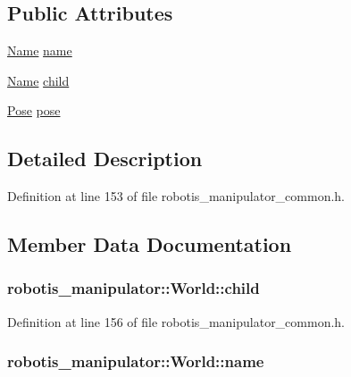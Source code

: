 \subsection*{Public Attributes}
\begin{DoxyCompactItemize}
\item 
\hyperlink{namespacerobotis__manipulator_a08c2d25e77a01ad75b9bb740f8ce4765}{Name} \hyperlink{structrobotis__manipulator_1_1_world_a9737d501dea9b5f0a16ef0c7ba36bff2}{name}
\item 
\hyperlink{namespacerobotis__manipulator_a08c2d25e77a01ad75b9bb740f8ce4765}{Name} \hyperlink{structrobotis__manipulator_1_1_world_a3f0a733de48c8f9bda4ae739c8bbaa08}{child}
\item 
\hyperlink{structrobotis__manipulator_1_1_pose}{Pose} \hyperlink{structrobotis__manipulator_1_1_world_ac396be42979a8e6537638e8f552b3144}{pose}
\end{DoxyCompactItemize}


\subsection{Detailed Description}


Definition at line 153 of file robotis\+\_\+manipulator\+\_\+common.\+h.



\subsection{Member Data Documentation}
\subsubsection[{\texorpdfstring{child}{child}}]{ robotis\+\_\+manipulator\+::\+World\+::child}\hypertarget{structrobotis__manipulator_1_1_world_a3f0a733de48c8f9bda4ae739c8bbaa08}{}\label{structrobotis__manipulator_1_1_world_a3f0a733de48c8f9bda4ae739c8bbaa08}


Definition at line 156 of file robotis\+\_\+manipulator\+\_\+common.\+h.

\subsubsection[{\texorpdfstring{name}{name}}]{ robotis\+\_\+manipulator\+::\+World\+::name}\hypertarget{structrobotis__manipulator_1_1_world_a9737d501dea9b5f0a16ef0c7ba36bff2}{}\label{structrobotis__manipulator_1_1_world_a9737d501dea9b5f0a16ef0c7ba36bff2}


